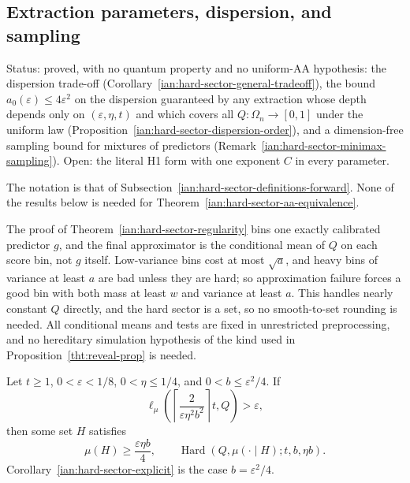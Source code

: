 \subsection{Extraction parameters, dispersion, and sampling}
\label{ian:hard-sector-smooth}

Status: proved, with no quantum property and no uniform-AA hypothesis: the dispersion trade-off (Corollary~\ref{ian:hard-sector-general-tradeoff}), the bound \(a_0(\varepsilon)\le4\varepsilon^2\) on the dispersion guaranteed by any extraction whose depth depends only on \((\varepsilon,\eta,t)\) and which covers all \(Q:\Omega_n\to[0,1]\) under the uniform law (Proposition~\ref{ian:hard-sector-dispersion-order}), and a dimension-free sampling bound for mixtures of predictors (Remark~\ref{ian:hard-sector-minimax-sampling}). Open: the literal H1 form with one exponent \(C\) in every parameter.

The notation is that of Subsection~\ref{ian:hard-sector-definitions-forward}.
None of the results below is needed for
Theorem~\ref{ian:hard-sector-aa-equivalence}.

\begin{remark}
\label{ian:hard-sector-dispersion-explanation}
The proof of Theorem~\ref{ian:hard-sector-regularity} bins one exactly
calibrated predictor \(g\), and the final approximator is the conditional
mean of \(Q\) on each score bin, not \(g\) itself. Low-variance bins cost at
most \(\sqrt a\), and heavy bins of variance at least \(a\) are bad unless
they are hard; so approximation failure forces a good bin with both mass
at least \(w\) and variance at least \(a\). This handles nearly constant
\(Q\) directly, and the hard sector is a set, so no smooth-to-set rounding
is needed. All conditional means and tests are fixed in unrestricted
preprocessing, and no hereditary simulation hypothesis of the kind used in
Proposition~\ref{tht:reveal-prop} is needed.
\end{remark}

\begin{corollary}
\label{ian:hard-sector-general-tradeoff}
Let \(t\ge1\), \(0<\varepsilon<1/8\), \(0<\eta\le1/4\), and
\(0<b\le\varepsilon^2/4\). If
\[
 \ell_\mu\left(
 \left\lceil\frac2{\varepsilon\eta^2b^2}\right\rceil t,Q
 \right)>\varepsilon,
\]
then some set \(H\) satisfies
\[
 \mu(H)\ge\frac{\varepsilon\eta b}{4},
 \qquad
 \operatorname{Hard}(Q,\mu(\cdot\mid H);t,b,\eta b).
\]
Corollary~\ref{ian:hard-sector-explicit} is the case
\(b=\varepsilon^2/4\).
\end{corollary}


